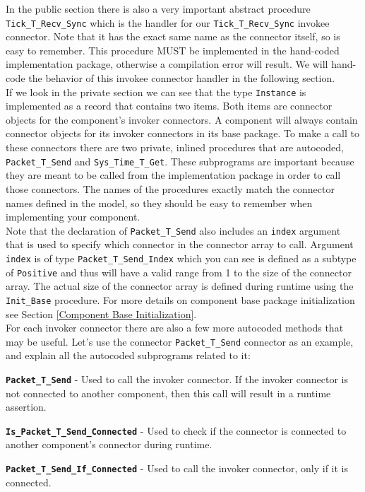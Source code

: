 In the public section there is also a very important abstract procedure \texttt{Tick\_T\_Recv\_Sync} which is the handler for our \texttt{Tick\_T\_Recv\_Sync} invokee connector. Note that it has the exact same name as the connector itself, so is easy to remember. This procedure MUST be implemented in the hand-coded implementation package, otherwise a compilation error will result. We will hand-code the behavior of this invokee connector handler in the following section. \\

If we look in the private section we can see that the type \texttt{Instance} is implemented as a record that contains two items. Both items are connector objects for the component's invoker connectors. A component will always contain connector objects for its invoker connectors in its base package. To make a call to these connectors there are two private, inlined procedures that are autocoded, \texttt{Packet\_T\_Send} and \texttt{Sys\_Time\_T\_Get}. These subprograms are important because they are meant to be called from the implementation package in order to call those connectors. The names of the procedures exactly match the connector names defined in the model, so they should be easy to remember when implementing your component. \\

Note that the declaration of \texttt{Packet\_T\_Send} also includes an \texttt{index} argument that is used to specify which connector in the connector array to call. Argument \texttt{index} is of type \texttt{Packet\_T\_Send\_Index} which you can see is defined as a subtype of \texttt{Positive} and thus will have a valid range from 1 to the size of the connector array. The actual size of the connector array is defined during runtime using the \texttt{Init\_Base} procedure. For more details on component base package initialization see Section \ref{Component Base Initialization}. \\

For each invoker connector there are also a few more autocoded methods that may be useful. Let's use the connector \texttt{Packet\_T\_Send} connector as an example, and explain all the autocoded subprograms related to it:

\vspace{5mm} %
\begin{spaceditemize}
  \item \textbf{\texttt{Packet\_T\_Send}} - Used to call the invoker connector. If the invoker connector is not connected to another component, then this call will result in a runtime assertion.
  \item \textbf{\texttt{Is\_Packet\_T\_Send\_Connected}} - Used to check if the connector is connected to another component's connector during runtime.
  \item \textbf{\texttt{Packet\_T\_Send\_If\_Connected}} - Used to call the invoker connector, only if it is connected.
\end{spaceditemize}
\vspace{5mm} %

